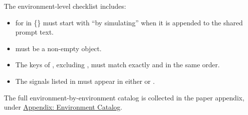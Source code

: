 \documentclass[11pt]{article}
\begin{document}
The environment-level checklist includes:

\begin{itemize}
\item {} for \termDescLevel in \{\} must start with ``by simulating'' when it is appended to the shared prompt text.
\item {} must be a non-empty object.
\item The keys of , excluding , must match  exactly and in the same order.
\item The signals listed in  must appear in either  or .
\end{itemize}

The full environment-by-environment catalog is collected in the paper appendix, under \hyperref[docstart:appendix_environment]{Appendix: Environment Catalog}.
\end{document}
